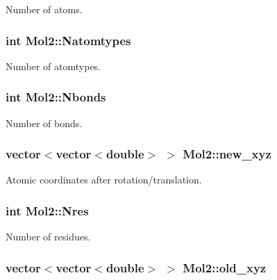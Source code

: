 Number of atoms. 

\hypertarget{classMol2_abec1d304ce65117eafb1bfc03bd37cae}{
\subsubsection[{Natomtypes}]{\setlength{\rightskip}{0pt plus 5cm}int {\bf Mol2::Natomtypes}}}
\label{classMol2_abec1d304ce65117eafb1bfc03bd37cae}


Number of atomtypes. 

\hypertarget{classMol2_a2c0dbb3b4214d3f462882f21ac0827d5}{
\subsubsection[{Nbonds}]{\setlength{\rightskip}{0pt plus 5cm}int {\bf Mol2::Nbonds}}}
\label{classMol2_a2c0dbb3b4214d3f462882f21ac0827d5}


Number of bonds. 

\hypertarget{classMol2_acc192964e0d203c413a24b5344cdcf20}{
\subsubsection[{new\_\-xyz}]{\setlength{\rightskip}{0pt plus 5cm}vector$<$vector$<$double$>$ $>$ {\bf Mol2::new\_\-xyz}}}
\label{classMol2_acc192964e0d203c413a24b5344cdcf20}


Atomic coordinates after rotation/translation. 

\hypertarget{classMol2_a1cc7fff66596ea277d2ff447082b8808}{
\subsubsection[{Nres}]{\setlength{\rightskip}{0pt plus 5cm}int {\bf Mol2::Nres}}}
\label{classMol2_a1cc7fff66596ea277d2ff447082b8808}


Number of residues. 

\hypertarget{classMol2_a610095e1130b4083d386ca5d5e279b1f}{
\subsubsection[{old\_\-xyz}]{\setlength{\rightskip}{0pt plus 5cm}vector$<$vector$<$double$>$ $>$ {\bf Mol2::old\_\-xyz}}}
\label{classMol2_a610095e1130b4083d386ca5d5e279b1f}


